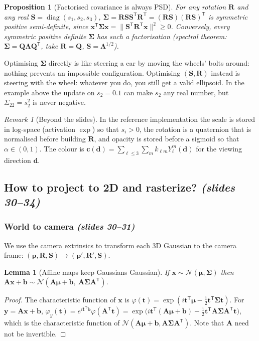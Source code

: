 \documentclass[11pt,a4paper]{article}
\newcommand{\N}{\mathcal{N}}
\newcommand{\T}{^{\mathsf T}}
\DeclareMathOperator{\diag}{diag}
\newcommand{\sr}[1]{\texorpdfstring{\emph{(#1)}}{(#1)}}
\theoremstyle{definition}
\theoremstyle{algstyle}
\theoremstyle{plain}
\newtheorem{lemma}[definition]{Lemma}
\newtheorem{proposition}[definition]{Proposition}
\theoremstyle{remark}
\newtheorem{remark}[definition]{Remark}
\begin{document}
\begin{proposition}[Factorised covariance is always PSD]
For any rotation $\bm R$ and any real $\bm S=\diag(s_1,s_2,s_3)$, $\bm\Sigma=\bm R\bm S\bm S\T\bm R\T=(\bm R\bm S)(\bm R\bm S)\T$ is symmetric positive semi-definite, since
$\bm x\T\bm\Sigma\bm x=\|\bm S\T\bm R\T\bm x\|^2\ge0$. Conversely, every symmetric positive definite $\bm\Sigma$ has such a factorisation (spectral theorem: $\bm\Sigma=\bm Q\bm\Lambda\bm Q\T$, take $\bm R=\bm Q$, $\bm S=\bm\Lambda^{1/2}$).
\end{proposition}

\begin{intuition}
Optimising $\bm\Sigma$ directly is like steering a car by moving the wheels' bolts around: nothing prevents an impossible configuration. Optimising $(\bm S,\bm R)$ instead is steering with the wheel: whatever you do, you still get a valid ellipsoid. In the example above the update on $s_2=0.1$ can make $s_2$ any real number, but $\Sigma_{22}=s_2^2$ is never negative.
\end{intuition}

\begin{remark}[Beyond the slides]
In the reference implementation the scale is stored in log-space (activation $\exp$) so that $s_i>0$, the rotation is a quaternion that is normalised before building $\bm R$, and opacity is stored before a sigmoid so that $\alpha\in(0,1)$. The colour is $\bm c(\bm d)=\sum_{\ell\le3}\sum_{m}k_{\ell m}Y_\ell^m(\bm d)$ for the viewing direction $\bm d$.
\end{remark}

\subsection{How to project to 2D and rasterize? \sr{slides 30--34}}
\subsubsection{World to camera \sr{slides 30--31}}
We use the camera extrinsics to transform each 3D Gaussian to the camera frame: $(\bm p,\bm R,\bm S)\to(\bm p',\bm R',\bm S)$.

\begin{lemma}[Affine maps keep Gaussians Gaussian]\label{lem:affine}
If $\bm x\sim\N(\bm\mu,\bm\Sigma)$ then $\bm A\bm x+\bm b\sim\N(\bm A\bm\mu+\bm b,\ \bm A\bm\Sigma\bm A\T)$.
\end{lemma}
\begin{proof}
The characteristic function of $\bm x$ is $\varphi(\bm t)=\exp(i\bm t\T\bm\mu-\tfrac12\bm t\T\bm\Sigma\bm t)$. For $\bm y=\bm A\bm x+\bm b$, $\varphi_y(\bm t)=e^{i\bm t\T\bm b}\varphi(\bm A\T\bm t)=\exp\big(i\bm t\T(\bm A\bm\mu+\bm b)-\tfrac12\bm t\T\bm A\bm\Sigma\bm A\T\bm t\big)$, which is the characteristic function of $\N(\bm A\bm\mu+\bm b,\bm A\bm\Sigma\bm A\T)$. Note that $\bm A$ need not be invertible.
\end{proof}
\end{document}
